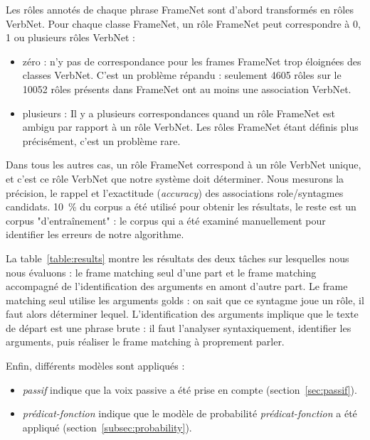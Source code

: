 Les rôles annotés de chaque phrase FrameNet sont d'abord transformés en rôles
VerbNet. Pour chaque classe FrameNet, un rôle FrameNet peut correspondre à 0, 1
ou plusieurs rôles VerbNet :

\begin{itemize}

    \item zéro : n'y pas de correspondance pour les frames FrameNet trop éloignées
    des classes VerbNet. C'est un problème répandu :  seulement 4605 rôles sur le
    10052 rôles présents dans FrameNet ont au moins une association VerbNet.

    \item plusieurs : Il y a plusieurs correspondances quand un rôle FrameNet
    est ambigu par rapport à un rôle VerbNet. Les rôles FrameNet étant définis plus
    précisément, c'est un problème rare. %

\end{itemize}

Dans tous les autres cas, un rôle FrameNet correspond à un rôle VerbNet unique,
et c'est ce rôle VerbNet que notre système doit déterminer. Nous mesurons la
précision, le rappel et l'exactitude (\emph{accuracy}) des associations
role/syntagmes candidats.  10~\% du corpus a été utilisé pour obtenir les
résultats, le reste est un corpus "d'entraînement" : le corpus qui a été
examiné manuellement pour identifier les erreurs de notre algorithme.

La table~\ref{table:results} montre les résultats des deux tâches sur
lesquelles nous nous évaluons : le frame matching seul d'une part et le frame
matching accompagné de l'identification des arguments en amont d'autre part. Le
frame matching seul utilise les arguments golds : on sait que ce syntagme joue
un rôle, il faut alors déterminer lequel. L'identification des arguments
implique que le texte de départ est une phrase brute : il faut l'analyser
syntaxiquement, identifier les arguments, puis réaliser le frame matching à
proprement parler.

Enfin, différents modèles sont appliqués :

\begin{itemize}

    \item \emph{passif} indique que la voix passive a été prise en compte
    (section~\ref{sec:passif}).

    \item \emph{prédicat-fonction} indique que le modèle de probabilité
    \emph{prédicat-fonction} a été appliqué (section~\ref{subsec:probability}).

\end{itemize}

